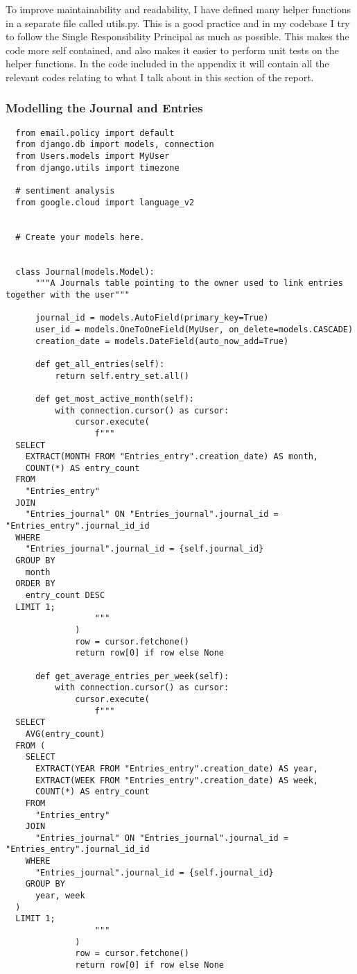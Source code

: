 To improve maintainability and readability, I have defined many helper functions in a separate file called utils.py. This is a good practice and in my codebase I try to follow the Single Responsibility Principal as much as possible. This makes the code more self contained, and also makes it easier to perform unit tests on the helper functions. In the code included in the appendix it will contain all the relevant codes relating to what I talk about in this section of the report.

\subsubsection{Modelling the Journal and Entries}
\begin{verbatim}
  from email.policy import default
  from django.db import models, connection
  from Users.models import MyUser
  from django.utils import timezone
  
  # sentiment analysis
  from google.cloud import language_v2
  
  
  # Create your models here.
  
  
  class Journal(models.Model):
      """A Journals table pointing to the owner used to link entries together with the user"""
  
      journal_id = models.AutoField(primary_key=True)
      user_id = models.OneToOneField(MyUser, on_delete=models.CASCADE)
      creation_date = models.DateField(auto_now_add=True)
  
      def get_all_entries(self):
          return self.entry_set.all()
  
      def get_most_active_month(self):
          with connection.cursor() as cursor:
              cursor.execute(
                  f"""
  SELECT
    EXTRACT(MONTH FROM "Entries_entry".creation_date) AS month,
    COUNT(*) AS entry_count
  FROM
    "Entries_entry"
  JOIN
    "Entries_journal" ON "Entries_journal".journal_id = "Entries_entry".journal_id_id
  WHERE
    "Entries_journal".journal_id = {self.journal_id}
  GROUP BY
    month
  ORDER BY
    entry_count DESC
  LIMIT 1;
                  """
              )
              row = cursor.fetchone()
              return row[0] if row else None
  
      def get_average_entries_per_week(self):
          with connection.cursor() as cursor:
              cursor.execute(
                  f"""
  SELECT
    AVG(entry_count)
  FROM (
    SELECT
      EXTRACT(YEAR FROM "Entries_entry".creation_date) AS year,
      EXTRACT(WEEK FROM "Entries_entry".creation_date) AS week,
      COUNT(*) AS entry_count
    FROM
      "Entries_entry"
    JOIN
      "Entries_journal" ON "Entries_journal".journal_id = "Entries_entry".journal_id_id
    WHERE
      "Entries_journal".journal_id = {self.journal_id}
    GROUP BY
      year, week
  )
  LIMIT 1; 
                  """
              )
              row = cursor.fetchone()
              return row[0] if row else None
  

\end{verbatim}
